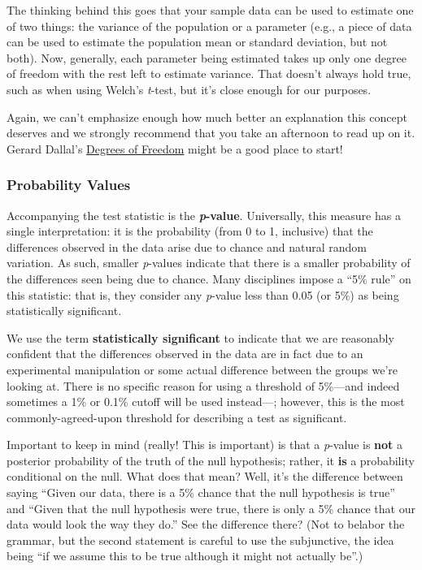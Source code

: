 The thinking behind this goes that your sample data can be used to estimate one of two things: the variance of the population or a parameter (e.g., a piece of data can be used to estimate the population mean or standard deviation, but not both). Now, generally, each parameter being estimated takes up only one degree of freedom with the rest left to estimate variance. That doesn't always hold true, such as when using Welch's \textit{t}-test, but it's close enough for our purposes.

Again, we can't emphasize enough how much better an explanation this concept deserves and we strongly recommend that you take an afternoon to read up on it. Gerard Dallal's \href{http://www.jerrydallal.com/LHSP/dof.htm}{Degrees of Freedom} might be a good place to start!

\subsubsection{Probability Values}
Accompanying the test statistic is the \textbf{\textit{p}-value}. Universally, this measure has a single interpretation: it is the probability (from 0 to 1, inclusive) that the differences observed in the data arise due to chance and natural random variation. As such, smaller \textit{p}-values indicate that there is a smaller probability of the differences seen being due to chance. Many disciplines impose a ``5\% rule'' on this statistic: that is, they consider any \textit{p}-value less than 0.05 (or 5\%) as being statistically significant.

We use the term \textbf{statistically significant} to indicate that we are reasonably confident that the differences observed in the data are in fact due to an experimental manipulation or some actual difference between the groups we're looking at. There is no specific reason for using a threshold of 5\%---and indeed sometimes a 1\% or 0.1\% cutoff will be used instead---; however, this is the most commonly-agreed-upon threshold for describing a test as significant.

Important to keep in mind (really! This is important) is that a \textit{p}-value is \textbf{not} a posterior probability of the truth of the null hypothesis; rather, it \textbf{is} a probability conditional on the null. What does that mean? Well, it's the difference between saying ``Given our data, there is a 5\% chance that the null hypothesis is true'' and ``Given that the null hypothesis were true, there is only a 5\% chance that our data would look the way they do.'' See the difference there? (Not to belabor the grammar, but the second statement is careful to use the subjunctive, the idea being ``if we assume this to be true although it might not actually be''.)

